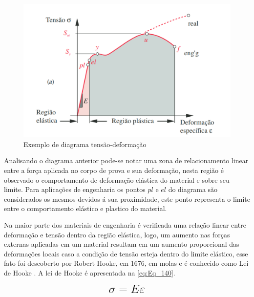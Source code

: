 \begin{figure}[htb]
	\caption{\label{fig:1020} Exemplo de diagrama tensão-deformação}
	\begin{center}
		\includegraphics[width=\textwidth]{pictures/1020.png}
	\end{center}
\end{figure}

Analisando o diagrama anterior pode-se notar uma zona de relacionamento linear entre a força aplicada no corpo de prova e sua deformação,
nesta região é observado o comportamento de deformação elástica do material e sobre seu limite.
Para aplicações de engenharia os pontos $pl$ e $el$ do diagrama são considerados os mesmos devidos á sua proximidade, este ponto representa
o limite entre o comportamento elástico e plastico do material. \autocite{Norton2011}

Na maior parte dos materiais de engenharia é verificada uma relação linear entre deformação e tensão dentro da região elástica, logo, um aumento
nas forças externas aplicadas em um material resultam em um aumento proporcional das deformações locais caso a condição de tensão esteja dentro
do limite elástico, esse fato foi descoberto por Robert Hooke, em 1676, em molas e é conhecido como Lei de Hooke \autocite{Hibbeler2010}.
A lei de Hooke é apresentada na \autoref{eq:Eq_140}.

\begin{equation}\label{eq:Eq_140}%
\mbox{\fontsize{17.28}{21.6}\selectfont\( %
\sigma = E \varepsilon
\)} %
\end{equation}

%
%
%

